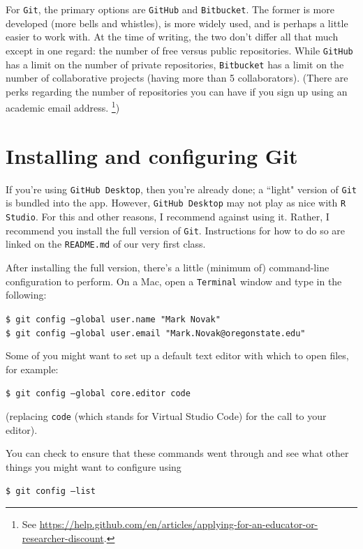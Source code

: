 \documentclass[12pt,letterpaper]{article}
\begin{document}
For \texttt{Git}, 
the primary options are \texttt{GitHub} and \texttt{Bitbucket}.
The former is more developed (more bells and whistles), 
is more widely used, 
and is perhaps a little easier to work with.
At the time of writing,
the two don't differ all that much except in one regard:  
the number of free versus public repositories.
While \texttt{GitHub} has a limit on the number of private repositories, 
\texttt{Bitbucket} has a limit on the number of collaborative projects
(having more than 5 collaborators).
(There are perks regarding the number of repositories you can have if you sign 
up using an academic email address.
\unskip
\footnote{
See 
\url{https://help.github.com/en/articles/applying-for-an-educator-or-researcher-discount}.})



\section{Installing and configuring Git}

If you're using \texttt{GitHub Desktop}, then you're already done;
a ``light" version of \texttt{Git} is bundled into the app.
However, \texttt{GitHub Desktop} may not play as nice with \texttt{R Studio}.
For this and other reasons, I recommend against using it.
Rather, I recommend you install the full version of \texttt{Git}.
Instructions for how to do so are linked on the \texttt{README.md} of our very 
first class.  

After installing the full version, there's a little (minimum of) command-line 
configuration to perform.
On a Mac, open a \texttt{Terminal} window and type in the following:

\noindent
     \texttt{\$ git config --global user.name "Mark Novak"}\\
     \texttt{\$ git config --global user.email "Mark.Novak@oregonstate.edu"}

\noindent
Some of you might want to set up a default text editor with which to open files,
for example:

\noindent
	\texttt{\$ git config --global core.editor code}

\noindent
(replacing \texttt{code} (which stands for Virtual Studio Code) for the call to your editor).

You can check to ensure that these commands went through and see what other things you might want to configure using

\noindent
\texttt{\$ git config --list}
\end{document}
